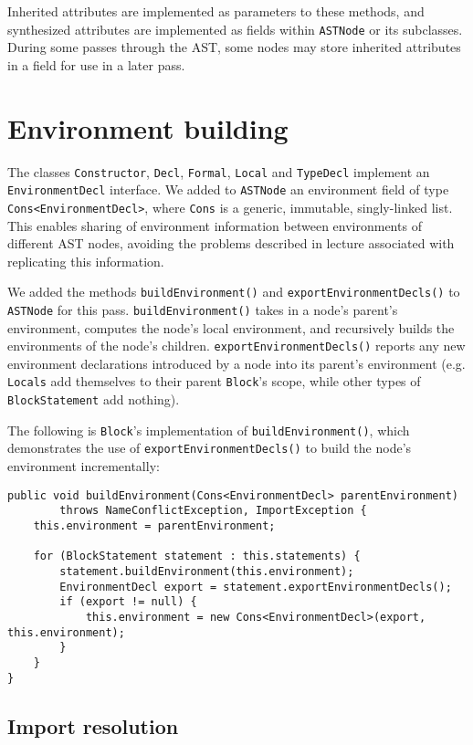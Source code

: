 \documentclass[12pt]{article}
\newcommand{\code}[1]{\texttt{#1}}
\begin{document}
Inherited attributes are implemented as parameters to these methods, and synthesized attributes are implemented as fields within \code{ASTNode} or its subclasses.  During some passes through the AST, some nodes may store inherited attributes in a field for use in a later pass.

\section{Environment building}

The classes \code{Constructor}, \code{Decl}, \code{Formal}, \code{Local} and \code{TypeDecl} implement an \code{EnvironmentDecl} interface. We added to \code{ASTNode} an environment field of type \code{Cons<EnvironmentDecl>}, where \code{Cons} is a generic, immutable, singly-linked list.  This enables sharing of environment information between environments of different AST nodes, avoiding the problems described in lecture associated with replicating this information.

We added the methods \code{buildEnvironment()} and \code{exportEnvironmentDecls()} to \code{ASTNode} for this pass. \code{buildEnvironment()} takes in a node's parent's environment, computes the node's local environment, and recursively builds the environments of the node's children.  \code{exportEnvironmentDecls()} reports any new environment declarations introduced by a node into its parent's environment (e.g. \code{Locals} add themselves to their parent \code{Block}'s scope, while other types of \code{BlockStatement} add nothing).

The following is \code{Block}'s implementation of \code{buildEnvironment()}, which demonstrates the use of \code{exportEnvironmentDecls()} to build the node's environment incrementally:

\begin{lstlisting}
public void buildEnvironment(Cons<EnvironmentDecl> parentEnvironment)
		throws NameConflictException, ImportException {
	this.environment = parentEnvironment;
	
	for (BlockStatement statement : this.statements) {
		statement.buildEnvironment(this.environment);
		EnvironmentDecl export = statement.exportEnvironmentDecls();
		if (export != null) {
			this.environment = new Cons<EnvironmentDecl>(export, this.environment);
		}
	}
}
\end{lstlisting}

\subsection{Import resolution}
\end{document}
